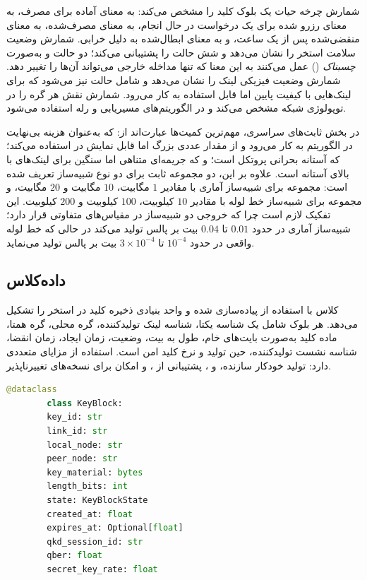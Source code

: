 شمارش  چرخه حیات یک بلوک کلید را مشخص می‌کند:  به معنای آماده برای مصرف،  به معنای رزرو شده برای یک درخواست در حال انجام،  به معنای مصرف‌شده،  به معنای منقضی‌شده پس از یک ساعت، و  به معنای ابطال‌شده به دلیل خرابی. شمارش  وضعیت سلامت استخر را نشان می‌دهد و شش حالت را پشتیبانی می‌کند؛ دو حالت  و  به‌صورت \emph{چسبناک} () عمل می‌کنند به این معنا که تنها مداخله خارجی می‌تواند آن‌ها را تغییر دهد. شمارش  وضعیت فیزیکی لینک را نشان می‌دهد و شامل حالت  نیز می‌شود که برای لینک‌هایی با کیفیت پایین اما قابل استفاده به کار می‌رود. شمارش  نقش هر گره را در توپولوژی شبکه مشخص می‌کند و در الگوریتم‌های مسیریابی و رله استفاده می‌شود.

در بخش ثابت‌های سراسری، مهم‌ترین کمیت‌ها عبارت‌اند از:  که به‌عنوان هزینه بی‌نهایت در الگوریتم  به کار می‌رود و از مقدار عددی بزرگ اما قابل نمایش در  استفاده می‌کند؛  که آستانه بحرانی پروتکل  است؛ و  که جریمه‌ای متناهی اما سنگین برای لینک‌های با  بالای آستانه است. علاوه بر این، دو مجموعه ثابت  برای دو نوع شبیه‌ساز تعریف شده است: مجموعه  برای شبیه‌ساز آماری با مقادیر $1$ مگابیت، $10$ مگابیت و $20$ مگابیت، و مجموعه  برای شبیه‌ساز خط لوله با مقادیر $10$ کیلوبیت، $100$ کیلوبیت و $200$ کیلوبیت. این تفکیک لازم است چرا که خروجی دو شبیه‌ساز در مقیاس‌های متفاوتی قرار دارد؛ شبیه‌ساز آماری در حدود $0.01$ تا $0.04$ بیت بر پالس تولید می‌کند در حالی که خط لوله واقعی در حدود $10^{-4}$ تا $3 \times 10^{-4}$ بیت بر پالس تولید می‌نماید.

\subsection{داده‌کلاس }

کلاس  با استفاده از  پیاده‌سازی شده و واحد بنیادی ذخیره کلید در استخر را تشکیل می‌دهد. هر بلوک شامل یک شناسه یکتا، شناسه لینک تولیدکننده، گره محلی، گره همتا، ماده کلید به‌صورت بایت‌های خام، طول به بیت، وضعیت، زمان ایجاد، زمان انقضا، شناسه نشست  تولیدکننده،  حین تولید و نرخ کلید امن است. استفاده از  مزایای متعددی دارد: تولید خودکار سازنده،  و ، پشتیبانی از ، و امکان  برای نسخه‌های تغییرناپذیر.

\begin{LTR}
	\begin{lstlisting}[language=Python]
		@dataclass
		class KeyBlock:
		key_id: str
		link_id: str
		local_node: str
		peer_node: str
		key_material: bytes
		length_bits: int
		state: KeyBlockState
		created_at: float
		expires_at: Optional[float]
		qkd_session_id: str
		qber: float
		secret_key_rate: float
	\end{lstlisting}
\end{LTR}

